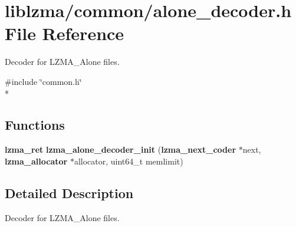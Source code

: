 \section{liblzma/common/alone\-\_\-decoder.h File Reference}
\label{alone__decoder_8h}


Decoder for L\-Z\-M\-A\-\_\-\-Alone files.  


{\ttfamily \#include \char`\"{}common.\-h\char`\"{}}\\*
\subsection*{Functions}
\begin{DoxyCompactItemize}
\item 
{\bf lzma\-\_\-ret} {\bfseries lzma\-\_\-alone\-\_\-decoder\-\_\-init} ({\bf lzma\-\_\-next\-\_\-coder} $\ast$next, {\bf lzma\-\_\-allocator} $\ast$allocator, uint64\-\_\-t memlimit)\label{alone__decoder_8h_ad1bf4e5324cc50fe3f3190d245fc4224}

\end{DoxyCompactItemize}


\subsection{Detailed Description}
Decoder for L\-Z\-M\-A\-\_\-\-Alone files. 